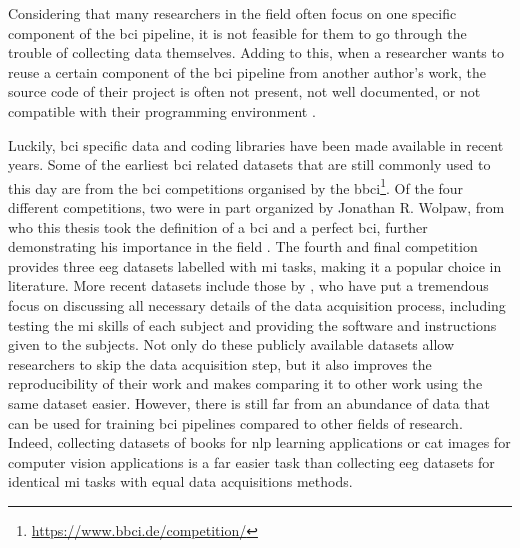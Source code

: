 Considering that many researchers in the field often focus on one specific component of the \gls{bci} pipeline, it is not feasible for them to go through the trouble of collecting data themselves.
Adding to this, when a researcher wants to reuse a certain component of the \gls{bci} pipeline from another author's work, the source code of their project is often not present, not well documented, or not compatible with their programming environment \citep{bci_review_arnau}.

Luckily, \gls{bci} specific data and coding libraries have been made available in recent years.
Some of the earliest \gls{bci} related datasets that are still commonly used to this day are from the \gls{bci} competitions organised by the \gls{bbci}\footnote{\url{https://www.bbci.de/competition/}}.
Of the four different competitions, two were in part organized by Jonathan R. Wolpaw, from who this thesis took the definition of a \gls{bci} and a perfect \gls{bci}, further demonstrating his importance in the field \citep{bci_competition2, bci_competition3}.
The fourth and final competition provides three \gls{eeg} datasets labelled with \gls{mi} tasks, making it a popular choice in literature.
More recent datasets include those by \citet{eeg_data}, who have put a tremendous focus on discussing all necessary details of the data acquisition process, including testing the \gls{mi} skills of each subject and providing the software and instructions given to the subjects.
Not only do these publicly available datasets allow researchers to skip the data acquisition step, but it also improves the reproducibility of their work and makes comparing it to other work using the same dataset easier.
However, there is still far from an abundance of data that can be used for training \gls{bci} pipelines compared to other fields of research.
Indeed, collecting datasets of books for \gls{nlp} learning applications or cat images for computer vision applications is a far easier task than collecting \gls{eeg} datasets for identical \gls{mi} tasks with equal data acquisitions methods.

